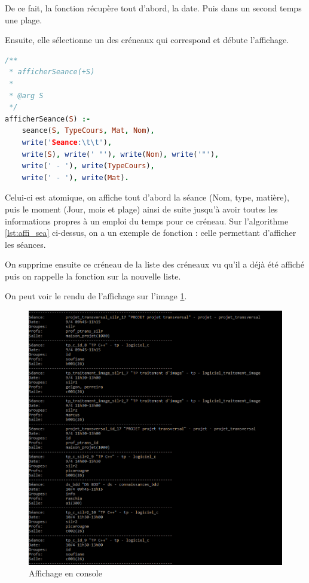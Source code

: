 De ce fait, la fonction récupère tout d'abord, la date. Puis dans un second temps une plage.

Ensuite, elle sélectionne un des créneaux qui correspond et débute l'affichage.

\begin{lstlisting}[language=Prolog, caption=Affichage, captionpos=b,
label={lst:affi_sea}]
/**
 * afficherSeance(+S)
 *
 * @arg S
 */
afficherSeance(S) :-
    seance(S, TypeCours, Mat, Nom),
    write('Seance:\t\t'),
    write(S), write(' "'), write(Nom), write('"'),
    write(' - '), write(TypeCours),
    write(' - '), write(Mat).
\end{lstlisting}

Celui-ci est atomique, on affiche tout d'abord la séance (Nom, type, matière), puis le moment (Jour, mois et plage) ainsi de suite jusqu'à avoir toutes les informations propres à un emploi du temps pour ce créneau.
Sur l'algorithme \ref{lst:affi_sea} ci-dessus, on a un exemple de fonction : celle permettant d'afficher les séances.

On supprime ensuite ce créneau de la liste des créneaux vu qu'il a déjà été affiché puis on rappelle la fonction sur la nouvelle liste.

On peut voir le rendu de l'affichage sur l'image \ref{fig:affi_sortie}.

\begin{figure}[t]
	\centering
    \includegraphics[keepaspectratio=true,width=12cm]{affichage.png}
        \caption{\label{fig:affi_sortie} Affichage en console}
\end{figure}


